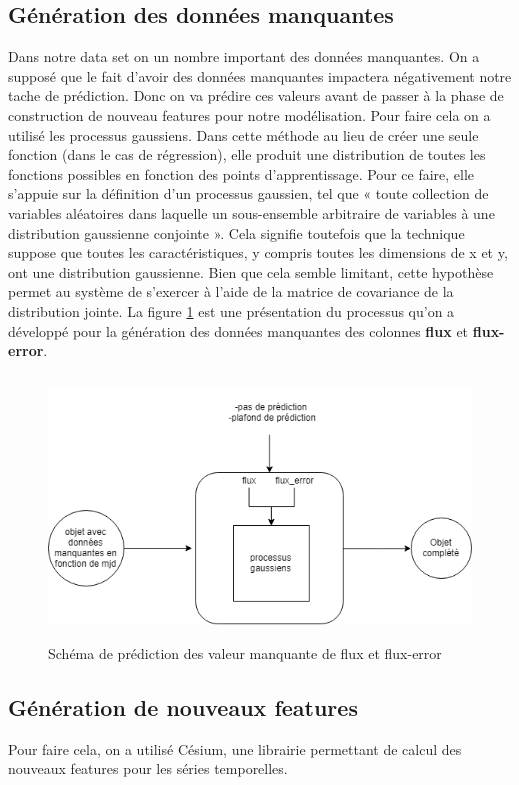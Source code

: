 \subsection{Génération des données manquantes}
 Dans notre data set on un nombre important des données manquantes. On a supposé que le fait d’avoir des données manquantes impactera négativement notre tache de prédiction. Donc on va prédire ces valeurs avant de passer à la phase de construction de nouveau features pour notre modélisation. Pour faire cela on a utilisé les processus gaussiens. Dans cette méthode au lieu de créer une seule fonction  (dans le cas de régression), elle produit une distribution de toutes les fonctions possibles en fonction des points d'apprentissage. Pour ce faire, elle s’appuie sur la définition d’un processus gaussien, tel que « toute collection de variables aléatoires dans laquelle un sous-ensemble arbitraire de variables à une distribution gaussienne conjointe ». Cela signifie toutefois que la technique suppose que toutes les caractéristiques, y compris toutes les dimensions de x et y, ont une distribution gaussienne. Bien que cela semble limitant, cette hypothèse permet au système de s'exercer à l'aide de la matrice de covariance de la distribution jointe.
La figure \ref{fig:blackbox_shema} est une présentation du processus qu'on a développé pour la génération des données manquantes  des colonnes \textbf{flux} et \textbf{flux-error}.
\begin{figure}[!h]
    \centering
    \includegraphics[width=12cm,height=7cm]{report/figures/blackbox.png}
    \caption{Schéma de prédiction des valeur manquante de flux et flux-error}
    \label{fig:blackbox_shema}
\end{figure}
\subsection{Génération de nouveaux features}
Pour faire cela, on a utilisé Césium, une librairie permettant de calcul des nouveaux features pour les séries temporelles. 
